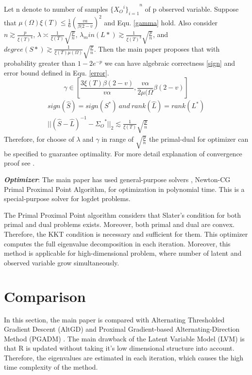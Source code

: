 \documentclass[10pt,conference]{IEEEtran}
\begin{document}
Let n denote to number of samples ${\{{X_O}^i\}_{i=1}}^n$ of p observed variable. Suppose that $\mu(\Omega) \xi(T) \leq \frac{1}{6}(\frac{v a}{\beta(2-v})^2$ and Equ. \ref{gamma} hold. Also consider $n \gtrsim \frac{p}{{\xi(T)}^4}$, $\lambda \asymp \frac{1}{\xi(T)} \sqrt{\frac{p}{n}}$, $\lambda_min(L*) \gtrsim \frac{1}{\xi(T)^3} \sqrt{\frac{p}{n}}$, and $degree(S*) \gtrsim \frac{1}{\xi(T) \mu(\Omega)} \sqrt{\frac{p}{n}}$. Then the main paper \cite{Chandra_1} proposes that with probability greater than $1-2 e^{-p}$ we can have algebraic correctness \ref{sign} and error bound defined in Equ. \ref{error}.
\begin{equation}
    \label{gamma}
    \gamma \in [\frac{3 \xi(T) \beta(2-v)}{v\alpha},\frac{v\alpha}{2 \mu(\Omega} \beta(2-v)]
\end{equation}
\begin{align}
    \label{sign}
    sign(\hat{S}) = sign(S^*) \ and \ rank(\hat{L}) = rank(L^*) \\ \label{error}
    ||(\hat{S}-\hat{L})^{-1} - {\Sigma_O}^*||_2 \lesssim \frac{1}{\xi(T)} \sqrt{\frac{p}{n}}
\end{align}
Therefore, for choose of $\lambda$ and $\gamma$ in range of $\sqrt{\frac{p}{n}}$ the primal-dual for optimizer can be specified to guarantee optimality. For more detail explanation of convergence proof see \cite{Chandra_1,wang2010solving}.

\textbf{\textit{Optimizer}}: The main paper \cite{Chandra_1} has used general-purpose solvers \cite{wang2010solving}, Newton-CG Primal Proximal Point Algorithm, for optimization in polynomial time. This is a special-purpose solver for logdet problems. 

The Primal Proximal Point algorithm considers that Slater's condition for both primal and dual problems exists. Moreover, both primal and dual are convex. Therefore, the KKT condition is necessary and sufficient for them. This optimizer computes the full eigenvalue decomposition in each iteration. Moreover, this method \cite{Chandra_1} is applicable for high-dimensional problem, where number of latent and observed variable grow simultaneously.

\section{Comparison} \label{comparison}
In this section, the main paper \cite{Chandra_1} is compared with Alternating Thresholded Gradient Descent (AltGD) \cite{xu2017speeding} and Proximal Gradient-based Alternating-Direction Method (PGADM) \cite{ma2013alternating}. The main drawback of the Latent Variable Model (LVM) \cite{Chandra_1} is that R is updated without taking it's low dimensional structure into account. Therefore, the eigenvalues are estimated in each iteration, which causes the high time complexity of the method.
 
\end{document}
